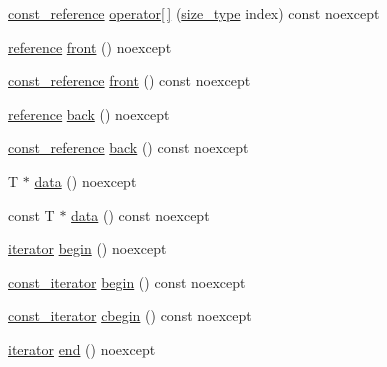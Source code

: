 \begin{DoxyCompactItemize}
\item 
\mbox{\hyperlink{classmage_1_1_dynamic_array_ad2c044077223c0463e317649d4513dbc}{const\+\_\+reference}} \mbox{\hyperlink{classmage_1_1_dynamic_array_af13fdc5bf67bf53d083df4dc5d4a8484}{operator\mbox{[}$\,$\mbox{]}}} (\mbox{\hyperlink{classmage_1_1_dynamic_array_abae3236bcd8d1de414cbdf05219966b9}{size\+\_\+type}} index) const noexcept
\item 
\mbox{\hyperlink{classmage_1_1_dynamic_array_ac725ab843a578b8eb2e4499eca728149}{reference}} \mbox{\hyperlink{classmage_1_1_dynamic_array_a6d63e95126e5f95630d558425a73ed0c}{front}} () noexcept
\item 
\mbox{\hyperlink{classmage_1_1_dynamic_array_ad2c044077223c0463e317649d4513dbc}{const\+\_\+reference}} \mbox{\hyperlink{classmage_1_1_dynamic_array_a5d0029b7258394447b55c2bb7f0d1181}{front}} () const noexcept
\item 
\mbox{\hyperlink{classmage_1_1_dynamic_array_ac725ab843a578b8eb2e4499eca728149}{reference}} \mbox{\hyperlink{classmage_1_1_dynamic_array_ac304cb15d51ea63fe0f95d9bc1aef911}{back}} () noexcept
\item 
\mbox{\hyperlink{classmage_1_1_dynamic_array_ad2c044077223c0463e317649d4513dbc}{const\+\_\+reference}} \mbox{\hyperlink{classmage_1_1_dynamic_array_a6c238a20078dbeb3f00e3c05224c709a}{back}} () const noexcept
\item 
T $\ast$ \mbox{\hyperlink{classmage_1_1_dynamic_array_a5653f65f6b0aa366dc5cb40594088ddc}{data}} () noexcept
\item 
const T $\ast$ \mbox{\hyperlink{classmage_1_1_dynamic_array_a52e0d7e1525ec918998df1855302ec52}{data}} () const noexcept
\item 
\mbox{\hyperlink{classmage_1_1_dynamic_array_af49b03e8ab90f3f38f6fc735cef81baf}{iterator}} \mbox{\hyperlink{classmage_1_1_dynamic_array_aaf4f02fa5341d2b46acc0d515142b8e7}{begin}} () noexcept
\item 
\mbox{\hyperlink{classmage_1_1_dynamic_array_ad27aa1273eb102bbd596a13a00159001}{const\+\_\+iterator}} \mbox{\hyperlink{classmage_1_1_dynamic_array_a18bade4268b82f931f031a2a9f599bf9}{begin}} () const noexcept
\item 
\mbox{\hyperlink{classmage_1_1_dynamic_array_ad27aa1273eb102bbd596a13a00159001}{const\+\_\+iterator}} \mbox{\hyperlink{classmage_1_1_dynamic_array_aee29dc1214ffb38086266690c09fca24}{cbegin}} () const noexcept
\item 
\mbox{\hyperlink{classmage_1_1_dynamic_array_af49b03e8ab90f3f38f6fc735cef81baf}{iterator}} \mbox{\hyperlink{classmage_1_1_dynamic_array_a0af633c402b6710678a6d114233d90d3}{end}} () noexcept

\end{DoxyCompactItemize}
